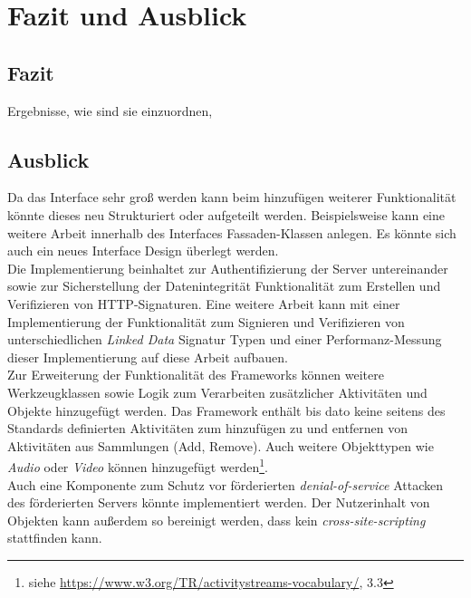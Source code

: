 \chapter{Fazit und Ausblick}
\section{Fazit}
Ergebnisse, wie sind sie einzuordnen, 
\section{Ausblick}
\label{ch:Conclusion}
Da das Interface sehr groß werden kann beim hinzufügen weiterer Funktionalität könnte dieses neu Strukturiert oder aufgeteilt werden. Beispielsweise kann eine weitere Arbeit innerhalb des Interfaces Fassaden-Klassen anlegen. Es könnte sich auch ein neues Interface Design überlegt werden.\\

Die Implementierung beinhaltet zur Authentifizierung der Server untereinander sowie zur Sicherstellung der Datenintegrität Funktionalität zum Erstellen und Verifizieren von HTTP-Signaturen. Eine weitere Arbeit kann mit einer Implementierung der Funktionalität zum Signieren und Verifizieren von unterschiedlichen \textit{Linked Data} Signatur Typen und einer Performanz-Messung dieser Implementierung auf diese Arbeit aufbauen.\\

Zur Erweiterung der Funktionalität des Frameworks können weitere Werkzeugklassen sowie Logik zum Verarbeiten zusätzlicher Aktivitäten und Objekte hinzugefügt werden. Das Framework enthält bis dato keine seitens des Standards definierten Aktivitäten zum hinzufügen zu und entfernen von Aktivitäten aus Sammlungen (Add, Remove). Auch weitere Objekttypen wie \textit{Audio} oder \textit{Video} können hinzugefügt werden\footnote{siehe \url{https://www.w3.org/TR/activitystreams-vocabulary/}, 3.3}.\\

Auch eine Komponente zum Schutz vor förderierten \textit{denial-of-service} Attacken des förderierten Servers könnte implementiert werden. Der Nutzerinhalt von Objekten kann außerdem so bereinigt werden, dass kein \textit{cross-site-scripting} stattfinden kann.
